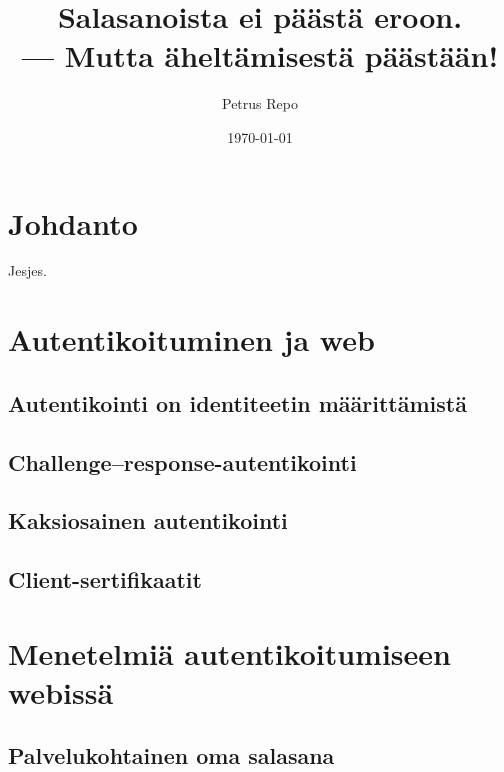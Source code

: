 \documentclass{tktltiki}
\begin{document}
\title{Salasanoista ei päästä eroon.\\ --- Mutta äheltämisestä päästään!}
\author{Petrus Repo}
\date{\today}
\maketitle


\onehalfspacing

\subject{Tietojenkäsittelytiede}

\keywords{}

\begin{abstract}

\end{abstract}

\setcounter{tocdepth}{3}
\mytableofcontents


\section{Johdanto}

Jesjes.

\section{Autentikoituminen ja web}
\subsection{Autentikointi on identiteetin määrittämistä}
\subsection{Challenge--response-autentikointi}
\subsection{Kaksiosainen autentikointi}
\subsection{Client-sertifikaatit}

\section{Menetelmiä autentikoitumiseen webissä}
\subsection{Palvelukohtainen oma salasana}
\end{document}

